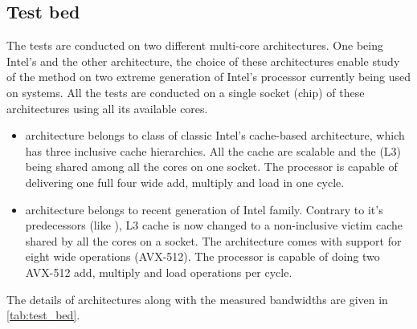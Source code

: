 \subsection{Test bed}
The tests are conducted on two different multi-core architectures. One being Intel's \IVB and the other \SKX architecture, the choice of these architectures enable study of the method on two extreme generation of Intel's processor currently being used on \HPC systems. All the tests are conducted on a single socket (chip) of these architectures using all its available cores. 

\begin{itemize}
	\item \Intel \IVB architecture belongs to class of classic Intel's cache-based architecture, which has three inclusive cache  hierarchies. All the cache are scalable and the \LLC (L3) being shared among all the cores on one socket. The processor is capable of delivering one full four wide \SIMD add, multiply and load in one cycle. 
	\item \Intel \SKX architecture belongs to recent generation of Intel family. Contrary to it's predecessors (like \IVB), L3 cache is now changed to a non-inclusive victim cache shared by all the cores on a socket. The architecture comes with support for eight wide \SIMD operations (AVX-512). The processor is capable of doing two AVX-512 add, multiply and load operations per cycle.
	\begin{comment}
	\item {\GW \AMD \EPY is based on AMD's Zen microarchitecture. The basic building block of the architecture consists of Core Complex (CCX) consisting of three cores (can extend upto four on high end models) each having it's own private L1 and L2 cache. The L3 cache is shared between a core complex and is non-inclusive victim cache. A single socket of \EPY consists of eight such CCX.}
	\end{comment}
	
\end{itemize}
The details of architectures along with the measured bandwidths are given in \cref{tab:test_bed}. 

